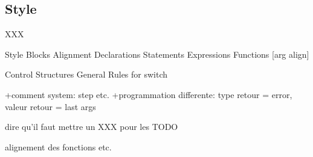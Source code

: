 %
%

\subsection{Style}

XXX


%
%

Style
  Blocks
  Alignment
  Declarations
  Statements
  Expressions
  Functions [arg align]

Control Structures
  General Rules
  for
  switch

+comment system: step etc.
+programmation differente: type retour = error, valeur retour = last args

dire qu'il faut mettre un XXX pour les TODO

alignement des fonctions etc.
